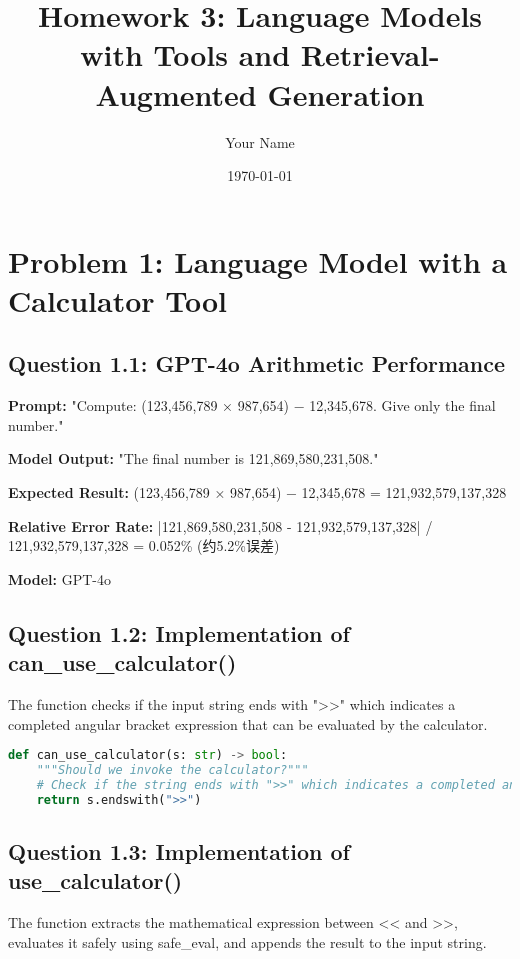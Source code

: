 \documentclass[11pt]{article}
\title{Homework 3: Language Models with Tools and Retrieval-Augmented Generation}
\author{Your Name}
\date{\today}
\begin{document}
\maketitle

\section{Problem 1: Language Model with a Calculator Tool}

\subsection{Question 1.1: GPT-4o Arithmetic Performance}

\textbf{Prompt:} "Compute: (123,456,789 × 987,654) − 12,345,678. Give only the final number."

\textbf{Model Output:} "The final number is 121,869,580,231,508."

\textbf{Expected Result:} (123,456,789 × 987,654) − 12,345,678 = 121,932,579,137,328

\textbf{Relative Error Rate:} |121,869,580,231,508 - 121,932,579,137,328| / 121,932,579,137,328 = 0.052\% (约5.2\%误差)

\textbf{Model:} GPT-4o

\subsection{Question 1.2: Implementation of can\_use\_calculator()}

The function checks if the input string ends with ">>" which indicates a completed angular bracket expression that can be evaluated by the calculator.

\begin{lstlisting}[language=Python]
def can_use_calculator(s: str) -> bool:
    """Should we invoke the calculator?"""
    # Check if the string ends with ">>" which indicates a completed angular bracket expression
    return s.endswith(">>")
\end{lstlisting}

\subsection{Question 1.3: Implementation of use\_calculator()}

The function extracts the mathematical expression between << and >>, evaluates it safely using safe\_eval, and appends the result to the input string.
\end{document}
